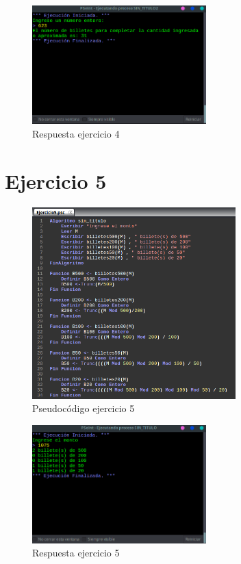 \documentclass[11pt, a4paper]{report}
\begin{document}
\begin{figure}[!ht]
\begin{center}
  \includegraphics[width=0.6\textwidth]{respuesta5.png}
  \caption{Respuesta ejercicio 4}
\end{center}
\end{figure}

\newpage
\section*{Ejercicio 5}

\begin{figure}[!ht]
\begin{center}
  \includegraphics[width=0.7\textwidth]{ejercicio5.png}
  \caption{Pseudoc\'odigo ejercicio 5}
\end{center}
\end{figure}

\begin{figure}[!ht]
\begin{center}
  \includegraphics[width=0.6\textwidth]{respuesta6.png}
  \caption{Respuesta ejercicio 5}
\end{center}
\end{figure}
\end{document}
